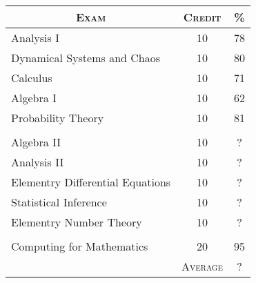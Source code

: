 \documentclass[a4paper]{article}
\begin{document}
\begin{center}
\begin{tabular}{lcc}

\multicolumn{1}{c}{\textsc{Exam}} & \textsc{Credit}&\textsc{\%}\\ \hline
Analysis I & 10 & 78\\
Dynamical Systems and Chaos & 10 & 80\\
Calculus & 10 & 71\\
Algebra I & 10 & 62\\
Probability Theory & 10 & 81\\
\\
Algebra II & 10 & ?\\
Analysis II & 10 & ?\\
Elementry Differential Equations & 10 & ?\\
Statistical Inference & 10 & ?\\
Elementry Number Theory & 10 & ?\\
\\
Computing for Mathematics & 20 & 95\\
\cline{2-3}
&\textsc{Average}&?

\end{tabular}
\end{center}
\bigskip
\end{document}
